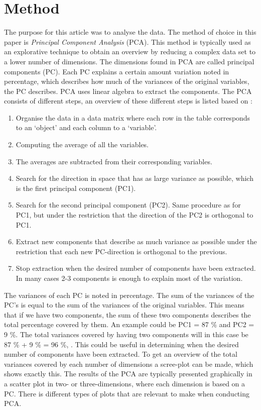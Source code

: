 \section*{Method}
\label{Method}
%
The purpose for this article was to analyse the data. The method of choice in this paper is \textit{Principal Component Analysis} (PCA). This method is typically used as an explorative technique to obtain an overview by reducing a complex data set to a lower number of dimensions. The dimensions found in PCA are called principal components (PC). Each PC explains a certain amount variation noted in percentage, which describes how much of the variances of the original variables, the PC describes.\blankline
%
PCA uses linear algebra to extract the components. The PCA consists of different steps, an overview of these different steps is listed based on \textcite[pp. 211-213]{Naes2010}:

\begin{enumerate}
	\item Organise the data in a data matrix where each row in the table corresponds to an ‘object’ and each column to a ‘variable’.
	\item Computing the average of all the variables. 
	\item The averages are subtracted from their corresponding variables.
	\item Search for the direction in space that has as large variance as possible, which is the first principal component (PC1).
	\item Search for the second principal component (PC2). Same procedure as for PC1, but under the restriction that the direction of the PC2 is orthogonal to PC1. 
	\item Extract new components that describe as much variance as possible under the restriction that each new PC-direction is orthogonal to the previous.
	\item Stop extraction when the desired number of components have been extracted. In many cases 2-3 components is enough to explain most of the variation. 
\end{enumerate}
\blankline
%
The variances of each PC is noted in percentage. The sum of the variances of the PC's is equal to the sum of the variances of the original variables. This means that if we have two components, the sum of these two components describes the total percentage covered by them. An example could be PC1 = 87 \% and PC2 = 9 \%. The total variances covered by having two components will in this case be 87 \% + 9 \% = 96 \%, \parencite[p. 213]{Naes2010}. This could be useful in determining when the desired number of components have been extracted. To get an overview of the total variances covered by each number of dimensions a scree-plot can be made, which shows exactly this. \blankline
%
The results of the PCA are typically presented graphically in a scatter plot in two- or three-dimensions, where each dimension is based on a PC. There is different types of plots that are relevant to make when conducting PCA. 

